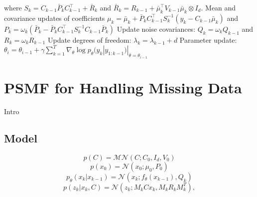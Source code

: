 \documentclass{mldsmsc}
\begin{document}
\begin{algorithm}[H]
\begin{algorithmic}[1]
\State \hspace{2em} where $S_k = C_{k-1} \bar{P}_k C_{k-1}^\top + \bar{R}_k$ and \hspace{1em} $\bar{R}_k = R_{k-1} + \bar{\mu}_k^\top V_{k-1} \bar{\mu}_k \otimes I_d$.
\State \hspace{2em} Mean and covariance updates of coefficients
\State \hspace{3em} $\mu_k = \bar{\mu}_k + \bar{P}_k C_{k-1}^\top S_k^{-1} (y_k - C_{k-1} \bar{\mu}_k)$ and \hspace{1em} $P_k = \omega_k (\bar{P}_k - \bar{P}_k C_{k-1}^\top S_k^{-1} C_{k-1} \bar{P}_k)$
\State \hspace{2em} Update noise covariances:
\State \hspace{3em} $Q_k = \omega_k Q_{k-1}$ and $R_k = \omega_k R_{k-1}$
\State \hspace{2em} Update degrees of freedom: 
\State \hspace{3em} $\lambda_k = \lambda_{k-1} + d$
\State \hspace{1em} Parameter update: 
\State \hspace{2em} $\theta_i = \theta_{i-1} + \gamma \sum_{k=1}^T \nabla_\theta \log p_\theta (y_k | y_{1:k-1}) |_{\theta = \theta_{i-1}}$
\end{algorithmic}\label{algo:2}
\end{algorithm}

\section{PSMF for Handling Missing Data}

Intro

\subsection{Model}

\begin{equation}
    p(C) = \mathcal{MN}(C; C_0, I_d, V_0)
\end{equation}
\begin{equation}
    p(x_0) = \mathcal{N}(x_0; \mu_0, P_0)
\end{equation}
\begin{equation}
    p_{\theta}(x_k | x_{k-1}) = \mathcal{N}(x_k; f_{\theta}(x_{k-1}), Q_k)
\end{equation}
\begin{equation}
    p(z_k | x_k, C) = \mathcal{N}(z_k; M_k Cx_k, M_k R_k M_{k}^{T}),
\end{equation}
\end{document}
